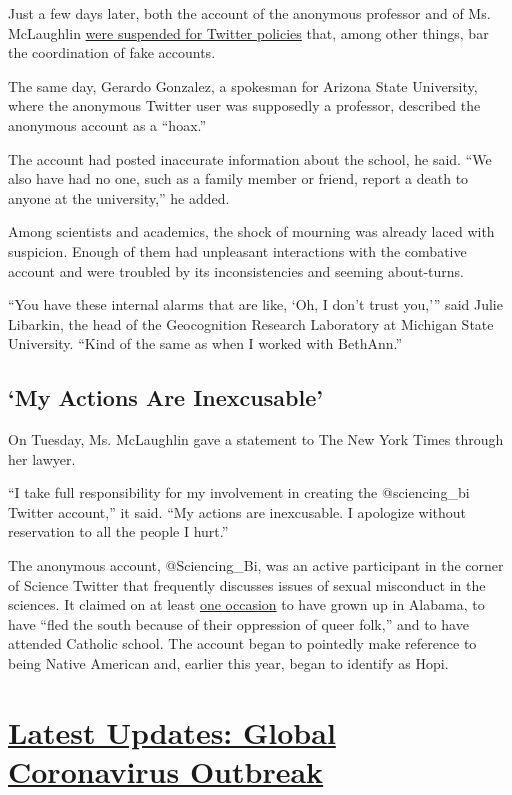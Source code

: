 Just a few days later, both the account of the anonymous professor and
of Ms. McLaughlin
\href{https://www.buzzfeednews.com/article/peteraldhous/bethann-mclaughlin-twitter-suspension-fake-covid-death}{were
suspended for Twitter policies} that, among other things, bar the
coordination of fake accounts.

The same day, Gerardo Gonzalez, a spokesman for Arizona State
University, where the anonymous Twitter user was supposedly a professor,
described the anonymous account as a ``hoax.''

The account had posted inaccurate information about the school, he said.
``We also have had no one, such as a family member or friend, report a
death to anyone at the university,'' he added.

Among scientists and academics, the shock of mourning was already laced
with suspicion. Enough of them had unpleasant interactions with the
combative account and were troubled by its inconsistencies and seeming
about-turns.

``You have these internal alarms that are like, `Oh, I don't trust
you,''' said Julie Libarkin, the head of the Geocognition Research
Laboratory at Michigan State University. ``Kind of the same as when I
worked with BethAnn.''

\hypertarget{my-actions-are-inexcusable}{%
\subsection{`My Actions Are
Inexcusable'}\label{my-actions-are-inexcusable}}

On Tuesday, Ms. McLaughlin gave a statement to The New York Times
through her lawyer.

``I take full responsibility for my involvement in creating the
@sciencing\_bi Twitter account,'' it said. ``My actions are inexcusable.
I apologize without reservation to all the people I hurt.''

The anonymous account, @Sciencing\_Bi, was an active participant in the
corner of Science Twitter that frequently discusses issues of sexual
misconduct in the sciences. It claimed on at least
\href{https://twitter.com/IsabelOtt/status/1290073135396528129/photo/1}{one
occasion} to have grown up in Alabama, to have ``fled the south because
of their oppression of queer folk,'' and to have attended Catholic
school. The account began to pointedly make reference to being Native
American and, earlier this year, began to identify as Hopi.

\hypertarget{latest-updates-global-coronavirus-outbreak}{%
\section{\texorpdfstring{\href{https://www.nytimes.com/2020/08/04/world/coronavirus-cases.html?action=click\&pgtype=Article\&state=default\&region=MAIN_CONTENT_1\&context=storylines_live_updates}{Latest
Updates: Global Coronavirus
Outbreak}}{Latest Updates: Global Coronavirus Outbreak}}\label{latest-updates-global-coronavirus-outbreak}}

